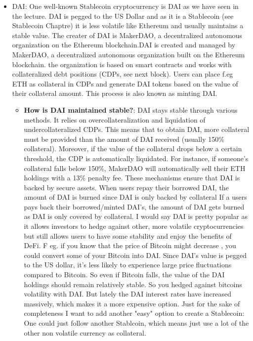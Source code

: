\documentclass{article}
\begin{document}
\begin{itemize}
\item {DAI}: One well-known Stablecoin cryptocurrency is DAI as we have seen in the lecture. DAI is pegged to the US Dollar and as it is a Stablecoin (see Stablecoin Chaptre) it is less volatile like Ethereum and usually maintains a stable value. The creater of DAI is MakerDAO, a decentralized autonomous organization on the Ethereum blockchain.DAI is created and managed by MakerDAO, a decentralized autonomous organization built on the Ethereum blockchain. the organization is based on smart contracts and works with collateralized debt positions (CDPs, see next block). Users can place f.eg ETH as collateral in CDPs and generate DAI tokens based on the value of their collateral amount. This process is also known as minting DAI.
\begin{itemize}
\item \textbf{How is DAI maintained stable?}: DAI stays stable through various methods. It relies on overcollateralization and liquidation of undercollateralized CDPs. This means that to obtain DAI, more collateral must be provided than the amount of DAI received (usually 150\% collateral). Moreover, if the value of the collateral drops below a certain threshold, the CDP is automatically liquidated. For instance, if someone's collateral falls below 150\%, MakerDAO will automatically sell their ETH holdings with a 13\% penalty fee. These mechanisms ensure that DAI is backed by secure assets. When users repay their borrowed DAI, the amount of DAI is burned since DAI is only backed by collateral If a users pays back their borrowed/minted DAI's, the amount of DAI gets burned as DAI is only covered by collateral. I would say DAI is pretty popular as it allows investors to hedge against other, more volatile cryptocurrencies but still allows users to have some stability and enjoy the benefits of DeFi. F eg. if you know that the price of Bitcoin might decrease , you could convert some of your Bitcoin into DAI. Since DAI's value is pegged to the US dollar, it's less likely to experience large price fluctuations compared to Bitcoin. So even if Bitcoin falls, the value of the DAI holdings should remain relatively stable. So you hedged against bitcoins volatility with DAI. But lately the DAI interest rates have increased massively, which makes it a more expensive option.
Just for the sake of completeness I want to add another "easy" option to create a Stablecoin: One could just follow another Stablcoin, which means just use a lot of the other non volatile currency as collateral.

\end{itemize}
\end{itemize}
\end{document}
